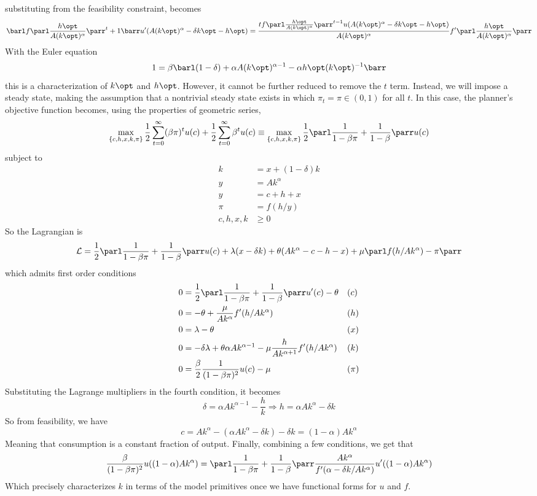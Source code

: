 \documentclass[10pt]{article}
\begin{document}
\begin{enumerate}
substituting from the feasibility constraint, becomes\[\barl f\parl \frac{h\opt}{A (k\opt)^\alpha}\parr^t + 1\barr u'(A(k\opt)^\alpha - \delta k\opt - h\opt) = \frac{tf\parl \frac{h\opt}{A (k\opt)^\alpha}\parr^{t-1}u(A(k\opt)^\alpha - \delta k\opt - h\opt)}{A (k\opt)^\alpha}f'\parl \frac{h\opt}{A (k\opt)^\alpha}\parr\]With the Euler equation\[1 = \beta \barl (1-\delta) + \alpha A (k\opt)^{\alpha-1} - \alpha h\opt (k\opt)^{-1}\barr\]this is a characterization of $k\opt$ and $h\opt$. However, it cannot be further reduced to remove the $t$ term. Instead, we will impose a steady state, making the assumption that a nontrivial steady state exists in which $\pi_t = \pi \in (0,1)$ for all $t$. In this case, the planner's objective function becomes, using the properties of geometric series, \[\max_{\{c,h,x,k,\pi\}} \frac{1}{2} \sum_{t=0}^\infty (\beta\pi)^t u(c) + \frac{1}{2} \sum_{t=0}^\infty \beta^t u(c) \equiv \max_{\{c,h,x,k,\pi\}} \frac{1}{2} \parl \frac{1}{1-\beta\pi} + \frac{1}{1-\beta}\parr u(c)\]subject to \begin{align*} k &= x + (1-\delta)k \\ y &= Ak^\alpha \\ y &= c + h + x \\ \pi &= f(h / y) \\ c,h,x,k &\ge 0 \end{align*}So the Lagrangian is\[ \mathcal{L} = \frac{1}{2} \parl \frac{1}{1-\beta\pi} + \frac{1}{1-\beta}\parr u(c) + \lambda (x - \delta k) + \theta(Ak^\alpha - c - h - x) + \mu \parl f(h / Ak^\alpha) - \pi\parr \]which admits first order conditions \begin{align*} 0 &= \frac{1}{2} \parl \frac{1}{1-\beta\pi} + \frac{1}{1-\beta}\parr u'(c) - \theta &&(c) \\0 &= -\theta + \frac{\mu}{Ak^\alpha} f'(h / Ak^\alpha) &&(h) \\ 0 &= \lambda - \theta &&(x) \\ 0 &= -\delta \lambda + \theta \alpha Ak^{\alpha-1} - \mu\frac{h}{Ak^{\alpha+1}}f'(h/Ak^\alpha) &&(k) \\0 &= \frac{\beta}{2} \frac{1}{(1-\beta\pi)^2}u(c) - \mu &&(\pi) \end{align*}Substituting the Lagrange multipliers in the fourth condition, it becomes \[\delta  = \alpha Ak^{\alpha-1} -\frac{h}{k} \Longrightarrow h = \alpha Ak^\alpha - \delta k\]So from feasibility, we have \[c = Ak^\alpha - (\alpha Ak^\alpha - \delta k) - \delta k = (1-\alpha)Ak^\alpha \]Meaning that consumption is a constant fraction of output. Finally, combining a few conditions, we get that \[ \frac{\beta}{(1-\beta\pi)^2}u((1-\alpha)Ak^\alpha) = \parl \frac{1}{1-\beta\pi} + \frac{1}{1-\beta}\parr \frac{Ak^\alpha}{f'(\alpha - \delta k / Ak^\alpha)}u'((1-\alpha)Ak^\alpha)\]Which precisely characterizes $k$ in terms of the model primitives once we have functional forms for $u$ and $f$.

\end{enumerate}
\end{document}
